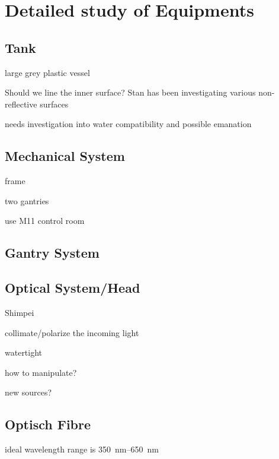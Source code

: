 \section{Detailed study of Equipments}





\subsection{Tank}

large grey plastic vessel

Should we line the inner surface? Stan has been investigating various
non-reflective surfaces

needs investigation into water compatibility and possible emanation





\subsection{Mechanical System}
frame

two gantries

use M11 control room






\subsection{Gantry System}

\subsection{Optical System/Head}

Shimpei

collimate/polarize the incoming light

watertight

how to manipulate?

new sources?


\subsection{Optisch Fibre}
ideal wavelength range is \SIrange{350}{650}{\nano\metre}

